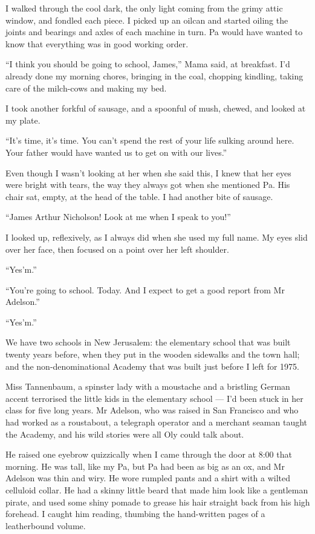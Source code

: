 I walked through the cool dark, the only light coming from the
grimy attic window, and fondled each piece. I picked up an oilcan
and started oiling the joints and bearings and axles of each
machine in turn. Pa would have wanted to know that everything was
in good working order.

\tb

``I think you should be going to school, James,'' Mama said, at
breakfast. I'd already done my morning chores, bringing in the
coal, chopping kindling, taking care of the milch-cows and making
my bed.

I took another forkful of sausage, and a spoonful of mush, chewed,
and looked at my plate.

``It's time, it's time. You can't spend the rest of your life sulking around 
here. Your father would have wanted us to get on with our lives.''

Even though I wasn't looking at her when she said this, I knew that
her eyes were bright with tears, the way they always got when she
mentioned Pa. His chair sat, empty, at the head of the table. I had
another bite of sausage.

``James Arthur Nicholson! Look at me when I speak to you!''

I looked up, reflexively, as I always did when she used my full
name. My eyes slid over her face, then focused on a point over her
left shoulder.

``Yes'm.''

``You're going to school. Today. And I expect to get a good report from Mr 
Adelson.''

``Yes'm.''

\tb

We have two schools in New Jerusalem: the elementary school that
was built twenty years before, when they put in the wooden
sidewalks and the town hall; and the non-denominational Academy
that was built just before I left for 1975.

Miss Tannenbaum, a spinster lady with a moustache and a bristling
German accent terrorised the little kids in the elementary school
--- I'd been stuck in her class for five long years. Mr Adelson,
who was raised in San Francisco and who had worked as a roustabout,
a telegraph operator and a merchant seaman taught the Academy, and
his wild stories were all Oly could talk about.

He raised one eyebrow quizzically when I came through the door at
8:00 that morning. He was tall, like my Pa, but Pa had been as big
as an ox, and Mr Adelson was thin and wiry. He wore rumpled pants
and a shirt with a wilted celluloid collar. He had a skinny little
beard that made him look like a gentleman pirate, and used some
shiny pomade to grease his hair straight back from his high
forehead. I caught him reading, thumbing the hand-written pages of
a leatherbound volume.

